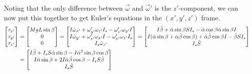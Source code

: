 \documentclass[10pt]{article}
\begin{document}
Noting that the only difference between $\vec{\omega}$ and $\vec{\omega}'$ 
is the $z'$-component, we can now 
put this together to get Euler's equations in the $(x',y',z')$ 
frame.
\begin{align}
    \begin{bmatrix}
        \tau_{x'} \\
        \tau_{y'} \\
        \tau_{z'} 
    \end{bmatrix}
    &=
    \begin{bmatrix}
        MgL\sin\beta \\
        0 \\
        0 
    \end{bmatrix}
    =
    \begin{bmatrix}
        I\dot{\omega}_{x'}+\omega'_{y'}\omega_{z'}I_s-\omega'_{z'}\omega_{y'}I\\
        I\dot{\omega}_{y'}+\omega'_{z'}\omega_{x'}I-\omega'_{x'}\omega_{z'}I_s\\
        I_s\dot{\omega}_{z'}
    \end{bmatrix}
    =
    \begin{bmatrix}
        I\ddot\beta +\dot\alpha\sin\beta SI_s 
            - \dot\alpha\cos\beta\dot\alpha\sin\beta I \\
        I(\ddot\alpha\sin\beta + \dot\alpha\dot\beta\cos\beta) 
            +\dot\alpha\dot\beta\cos\beta I
            -\dot\beta SI_s \\
        I_s\dot S 
    \end{bmatrix}
    \notag \\
    &=
    \begin{bmatrix}
        I\ddot\beta +I_sS\dot\alpha\sin\beta 
            - I\dot\alpha^2\sin\beta\cos\beta \\
        I\ddot\alpha\sin\beta + 2I\dot\alpha\dot\beta\cos\beta 
            -I_sS\dot\beta \\
        I_s\dot S 
    \end{bmatrix}
\end{align}
\end{document}
